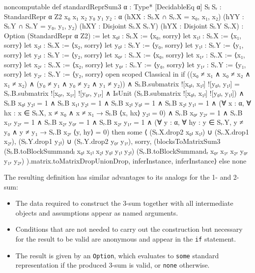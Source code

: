 \begin{leancode}
noncomputable def standardReprSum3 {α : Type*}
    [DecidableEq α]
    {Sₗ Sᵣ : StandardRepr α Z2}
    {x₀ x₁ x₂ y₀ y₁ y₂ : α}
    (hXX : Sₗ.X ∩ Sᵣ.X = {x₀, x₁, x₂})
    (hYY : Sₗ.Y ∩ Sᵣ.Y = {y₀, y₁, y₂})
    (hXY : Disjoint Sₗ.X Sᵣ.Y)
    (hYX : Disjoint Sₗ.Y Sᵣ.X) :
    Option (StandardRepr α Z2) :=
  let x₀ₗ : Sₗ.X := ⟨x₀, sorry⟩
  let x₁ₗ : Sₗ.X := ⟨x₁, sorry⟩
  let x₂ₗ : Sₗ.X := ⟨x₂, sorry⟩
  let y₀ₗ : Sₗ.Y := ⟨y₀, sorry⟩
  let y₁ₗ : Sₗ.Y := ⟨y₁, sorry⟩
  let y₂ₗ : Sₗ.Y := ⟨y₂, sorry⟩
  let x₀ᵣ : Sᵣ.X := ⟨x₀, sorry⟩
  let x₁ᵣ : Sᵣ.X := ⟨x₁, sorry⟩
  let x₂ᵣ : Sᵣ.X := ⟨x₂, sorry⟩
  let y₀ᵣ : Sᵣ.Y := ⟨y₀, sorry⟩
  let y₁ᵣ : Sᵣ.Y := ⟨y₁, sorry⟩
  let y₂ᵣ : Sᵣ.Y := ⟨y₂, sorry⟩
  open scoped Classical in if
    ((x₀ ≠ x₁ ∧ x₀ ≠ x₂ ∧ x₁ ≠ x₂) ∧
     (y₀ ≠ y₁ ∧ y₀ ≠ y₂ ∧ y₁ ≠ y₂))
    ∧ Sₗ.B.submatrix ![x₀ₗ, x₁ₗ] ![y₀ₗ, y₁ₗ] =
      Sᵣ.B.submatrix ![x₀ᵣ, x₁ᵣ] ![y₀ᵣ, y₁ᵣ]
    ∧ IsUnit (Sₗ.B.submatrix ![x₀ₗ, x₁ₗ] ![y₀ₗ, y₁ₗ])
    ∧ Sₗ.B x₀ₗ y₂ₗ = 1
    ∧ Sₗ.B x₁ₗ y₂ₗ = 1
    ∧ Sₗ.B x₂ₗ y₀ₗ = 1
    ∧ Sₗ.B x₂ₗ y₁ₗ = 1
    ∧ (∀ x : α, ∀ hx : x ∈ Sₗ.X, x ≠ x₀ ∧ x ≠ x₁ →
        Sₗ.B ⟨x, hx⟩ y₂ₗ = 0)
    ∧ Sᵣ.B x₀ᵣ y₂ᵣ = 1
    ∧ Sᵣ.B x₁ᵣ y₂ᵣ = 1
    ∧ Sᵣ.B x₂ᵣ y₀ᵣ = 1
    ∧ Sᵣ.B x₂ᵣ y₁ᵣ = 1
    ∧ (∀ y : α, ∀ hy : y ∈ Sᵣ.Y, y ≠ y₀ ∧ y ≠ y₁ →
        Sᵣ.B x₂ᵣ ⟨y, hy⟩ = 0)
  then
    some ⟨
      (Sₗ.X.drop2 x₀ₗ x₁ₗ) ∪ (Sᵣ.X.drop1 x₂ᵣ),
      (Sₗ.Y.drop1 y₂ₗ) ∪ (Sᵣ.Y.drop2 y₀ᵣ y₁ᵣ),
      sorry,
      (blocksToMatrixSum3
        (Sₗ.B.toBlockSummandₗ x₀ₗ x₁ₗ x₂ₗ y₀ₗ y₁ₗ y₂ₗ)
        (Sᵣ.B.toBlockSummandᵣ x₀ᵣ x₁ᵣ x₂ᵣ y₀ᵣ y₁ᵣ y₂ᵣ)
      ).matrix.toMatrixDropUnionDrop,
      inferInstance,
      inferInstance⟩
  else
    none
\end{leancode}
The resulting definition has similar advantages to its analogs for the 1- and 2-sum:
\begin{itemize}
    \item The data required to construct the 3-sum together with all intermediate objects and assumptions appear as named arguments.
    \item Conditions that are not needed to carry out the construction but necessary for the result to be valid are anonymous and appear in the \texttt{if} statement.
    \item The result is given by an \texttt{Option}, which evaluates to \texttt{some} standard representation if the produced 3-sum is valid, or \texttt{none} otherwise.
\end{itemize}



